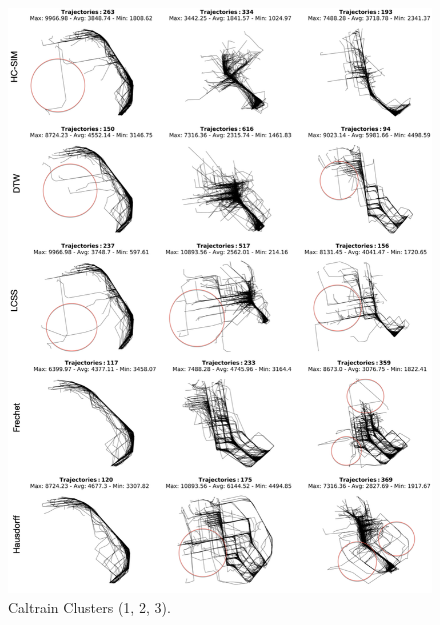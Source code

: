 \documentclass[a4paper, 12pt]{article}
\begin{document}
\begin{figure}[htbp!]
    \centering
    \includegraphics[width=1\textwidth]{Caltrain 1.png}
    \caption{Caltrain Clusters (1, 2, 3).}
    \label{fig40}
\end{figure}
\end{document}
